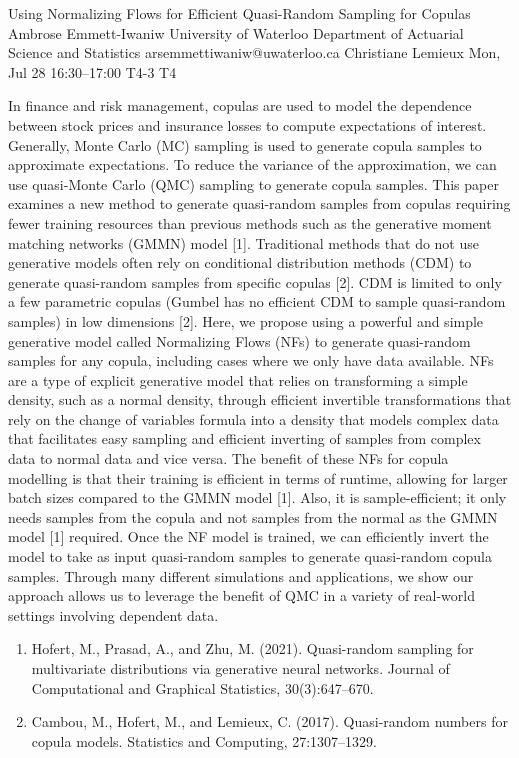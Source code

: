 \documentclass[12pt,lettersize,oneside]{book} %
\begin{document}
\begin{talk}
  {Using Normalizing Flows for Efficient Quasi-Random Sampling for Copulas}%
  {Ambrose Emmett-Iwaniw}%
  {University of Waterloo Department of Actuarial Science and Statistics}%
  {arsemmettiwaniw@uwaterloo.ca}%
  {Christiane Lemieux}%
  {}%
  {Mon, Jul 28 16:30--17:00}%
  {T4-3}%
  {T4}%
  
    
   
In finance and risk management, copulas are used to model the dependence between stock prices and insurance losses to compute expectations of interest. Generally, Monte Carlo (MC) sampling is used to generate copula samples to approximate expectations. To reduce the variance of the approximation, we can use quasi-Monte Carlo (QMC) sampling to generate copula samples. This paper examines a new method to generate quasi-random samples from copulas requiring fewer training resources than previous methods such as the generative moment matching networks (GMMN) model [1]. Traditional methods that do not use generative models often rely on conditional distribution methods (CDM) to generate quasi-random samples from specific copulas [2]. CDM is limited to only a few parametric copulas (Gumbel has no efficient CDM to sample quasi-random samples) in low dimensions [2]. Here, we propose using a powerful and simple generative model called Normalizing Flows (NFs) to generate quasi-random samples for any copula, including cases where we only have data available. NFs are a type of explicit generative model that relies on transforming a simple density, such as a normal density, through efficient invertible transformations that rely on the change of variables formula into a density that models complex data that facilitates easy sampling and efficient inverting of samples from complex data to normal data and vice versa. The benefit of these NFs for copula modelling is that their training is efficient in terms of runtime, allowing for larger batch sizes compared to the GMMN model [1]. Also, it is sample-efficient; it only needs samples from the copula and not samples from the normal as the GMMN model [1] required. Once the NF model is trained, we can efficiently invert the model to take as input quasi-random samples to generate quasi-random copula samples. Through many different simulations and applications, we show our approach allows us to leverage the benefit of QMC in a variety of real-world settings involving dependent data.
\medskip

\begin{enumerate}
 \item[{[1]}] Hofert, M., Prasad, A., and Zhu, M. (2021). Quasi-random sampling for multivariate distributions via generative neural networks. Journal of Computational and Graphical Statistics,
30(3):647--670.
 \item[{[2]}] Cambou, M., Hofert, M., and Lemieux, C. (2017). Quasi-random numbers for copula models. Statistics and Computing, 27:1307--1329. 
\end{enumerate}
\end{talk}
\end{document}

